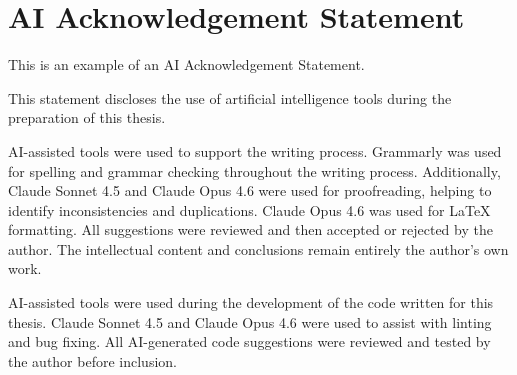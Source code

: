 \chapter*{AI Acknowledgement Statement}

This is an example of an AI Acknowledgement Statement.

This statement discloses the use of artificial intelligence tools during the preparation of this thesis.


AI-assisted tools were used to support the writing process. Grammarly \citep{Grammarly2025} was used for spelling and grammar checking throughout the writing process. Additionally, Claude Sonnet 4.5 \citep{Anthropic2025Sonnet} and Claude Opus 4.6 \citep{Anthropic2026Opus}  were used for proofreading, helping to identify inconsistencies and duplications. 
Claude Opus 4.6 \citep{Anthropic2026Opus} was used for LaTeX formatting.
All suggestions were reviewed and then accepted or rejected by the author. The intellectual content and conclusions remain entirely the author's own work.


AI-assisted tools were used during the development of the code written for this thesis. Claude Sonnet 4.5 \citep{Anthropic2025Sonnet} and Claude Opus 4.6 \citep{Anthropic2026Opus} were used to assist with linting and bug fixing. All AI-generated code suggestions were reviewed and tested by the author before inclusion.
